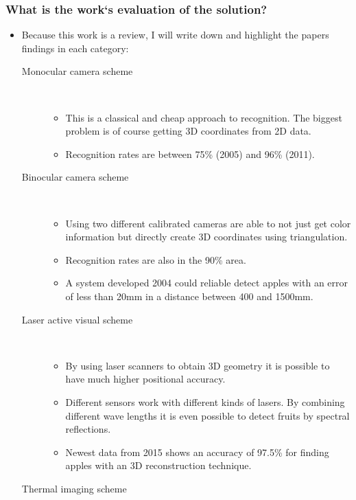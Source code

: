     \subsubsection*{What is the work`s evaluation of the solution?}
    \begin{itemize}
        \item Because this work is a review, I will write down and highlight the papers findings in each category:
        \begin{description}
            \item[Monocular camera scheme] \ 
            \begin{itemize} 
                \item This is a classical and cheap approach to recognition. The biggest problem is of course getting 3D coordinates from 2D data.
                \item Recognition rates are between 75\% (2005) and 96\% (2011). 
             \end{itemize}
            \item[Binocular camera scheme] \ 
            \begin{itemize} 
                \item Using two different calibrated cameras are able to not just get color information but directly create 3D coordinates using triangulation.
                \item Recognition rates are also in the 90\% area. 
                \item A system developed 2004 could reliable detect apples with an error of  less than 20mm in a distance between 400 and 1500mm.
             \end{itemize}
            \item[Laser active visual scheme] \ 
            \begin{itemize} 
                \item By using laser scanners to obtain 3D geometry it is possible to have much higher positional accuracy.
                \item Different sensors work with different kinds of lasers. By combining different wave lengths it is even possible to detect fruits by spectral reflections.
                \item Newest data from 2015 shows an accuracy of 97.5\% for finding apples with an 3D reconstruction technique.
             \end{itemize}
            \item[Thermal imaging scheme] \ 

\end{description}
\end{itemize}
